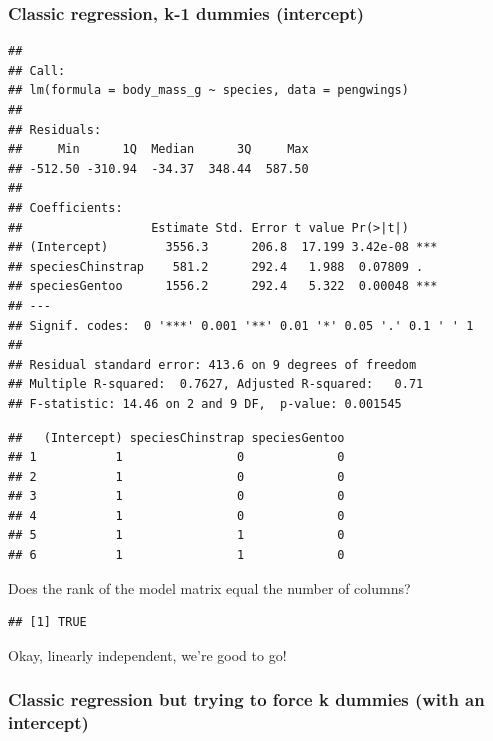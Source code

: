 \documentclass[
  openany]{book}
\begin{document}
\hypertarget{classic-regression-k-1-dummies-intercept}{%
\subsubsection{Classic regression, k-1 dummies (intercept)}\label{classic-regression-k-1-dummies-intercept}}

\begin{verbatim}
## 
## Call:
## lm(formula = body_mass_g ~ species, data = pengwings)
## 
## Residuals:
##     Min      1Q  Median      3Q     Max 
## -512.50 -310.94  -34.37  348.44  587.50 
## 
## Coefficients:
##                  Estimate Std. Error t value Pr(>|t|)    
## (Intercept)        3556.3      206.8  17.199 3.42e-08 ***
## speciesChinstrap    581.2      292.4   1.988  0.07809 .  
## speciesGentoo      1556.2      292.4   5.322  0.00048 ***
## ---
## Signif. codes:  0 '***' 0.001 '**' 0.01 '*' 0.05 '.' 0.1 ' ' 1
## 
## Residual standard error: 413.6 on 9 degrees of freedom
## Multiple R-squared:  0.7627, Adjusted R-squared:   0.71 
## F-statistic: 14.46 on 2 and 9 DF,  p-value: 0.001545
\end{verbatim}

\begin{verbatim}
##   (Intercept) speciesChinstrap speciesGentoo
## 1           1                0             0
## 2           1                0             0
## 3           1                0             0
## 4           1                0             0
## 5           1                1             0
## 6           1                1             0
\end{verbatim}

Does the rank of the model matrix equal the number of columns?

\begin{verbatim}
## [1] TRUE
\end{verbatim}

Okay, linearly independent, we're good to go!

\hypertarget{classic-regression-but-trying-to-force-k-dummies-with-an-intercept}{%
\subsubsection{Classic regression but trying to force k dummies (with an intercept)}\label{classic-regression-but-trying-to-force-k-dummies-with-an-intercept}}
\end{document}
